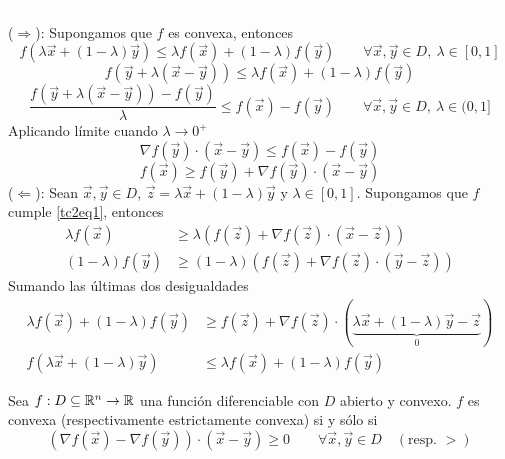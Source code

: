 \begin{demostracion}
\textcolor{white}{linea en blanco}
\\($\Rightarrow$): Supongamos que $f$ es convexa, entonces
$$f(\lambda \vec{x} + (1-\lambda)\vec{y})\leq \lambda f(\vec{x}) + (1-\lambda)f(\vec{y}) \qquad \forall \vec{x},\vec{y}\in D ,\: \lambda \in [0,1]$$
$$f(\vec{y}+\lambda (\vec{x}-\vec{y}))\leq \lambda f(\vec{x}) + (1-\lambda)f(\vec{y})$$
$$\frac{f(\vec{y}+\lambda (\vec{x}-\vec{y}))-f(\vec{y})}{\lambda}\leq f(\vec{x})-f(\vec{y}) \qquad \forall \vec{x},\vec{y}\in D ,\: \lambda \in (0,1]$$
Aplicando l\'imite cuando $\lambda \to 0^+$
$$\nabla f(\vec{y})\cdot(\vec{x}-\vec{y})\leq f(\vec{x})-f(\vec{y})$$
$$f(\vec{x})\geq f(\vec{y})+\nabla f(\vec{y})\cdot(\vec{x}-\vec{y})$$
($\Leftarrow$): Sean $\vec{x},\vec{y}\in D$, $\vec{z}=\lambda \vec{x}+(1-\lambda)\vec{y}$ y $\lambda \in [0,1]$. Supongamos que $f$ cumple \eqref{tc2eq1}, entonces
\begin{align*}
\lambda f(\vec{x})     & \geq \lambda(f(\vec{z})+\nabla f(\vec{z})\cdot(\vec{x}-\vec{z})) \\
(1-\lambda) f(\vec{y}) & \geq (1-\lambda)(f(\vec{z})+\nabla f(\vec{z})\cdot(\vec{y}-\vec{z})) 
\end{align*}
Sumando las \'ultimas dos desigualdades
\begin{align*}
\lambda f(\vec{x})+(1-\lambda)f(\vec{y}) & \geq f(\vec{z})+\nabla f(\vec{z})\cdot(\underbrace{\lambda \vec{x} + (1-\lambda)\vec{y}-\vec{z}}_{0}) \\
f(\lambda \vec{x} + (1-\lambda)\vec{y})  & \leq \lambda f(\vec{x})+(1-\lambda)f(\vec{y})
\end{align*}
\end{demostracion}

\begin{teorema}\label{teoconvexidad4}
Sea $f: D\subseteq \mathbb{R}^n \to \mathbb{R}$ una funci\'on diferenciable con $D$ abierto y convexo. $f$ es convexa (respectivamente estrictamente convexa) si y s\'olo si
\begin{equation}\label{tc3eq1}
(\nabla f(\vec{x}) - \nabla f(\vec{y}))\cdot(\vec{x}-\vec{y}) \geq 0 \qquad \forall \vec{x},\vec{y}\in D \quad (\text{resp. }>)
\end{equation}
\end{teorema}

